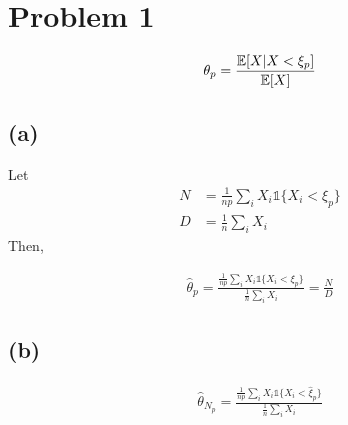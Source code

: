 \documentclass[../PSET1Tamer.tex]{subfiles}
\begin{document}
 
\section*{Problem 1}

\begin{align*}
  \theta_p = \frac{\operatorname{\mathbb{E}}[X|X<\xi_p]}{\operatorname{\mathbb{E}}[X]}
\end{align*} 
\subsection*{(a)}
Let 
\begin{align*}
  N &= \frac{1}{np}\sum_{i} X_i \mathds{1}\{X_i<\xi_p\} \\
  D &= \frac{1}{n}\sum_{i}X_i
\end{align*}
Then,

\begin{align*}
  \hat{\theta}_p = \frac{\frac{1}{np}\sum_{i} X_i \mathds{1}\{X_i<\xi_p\}}{\frac{1}{n}\sum_{i}X_i} = \frac{N}{D}
\end{align*} 



\subsection*{(b)}
\begin{align*}
  \hat{\theta}_{N_p} = \frac{\frac{1}{np}\sum_{i} X_i \mathds{1}\{X_i<\hat{\xi}_p\}}{\frac{1}{n}\sum_{i}X_i}
\end{align*}
\end{document}
